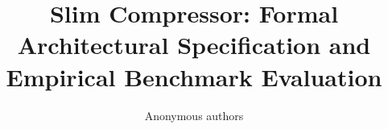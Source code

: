 \title{\textbf{Slim Compressor: Formal Architectural Specification and Empirical Benchmark Evaluation}}

\author{Anonymous authors}
